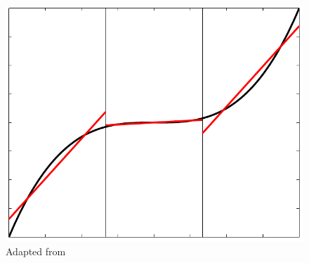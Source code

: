 \begin{frame}
\begin{columns}[t]
\begin{figure}[htbp]
				\includegraphics[height=0.31\textheight]{img/dg.pdf}
				\vspace{-0.1cm}
				\caption{Adapted from \cite{muller2014}}
			\end{figure} 
		\end{columns}
	\end{frame}

